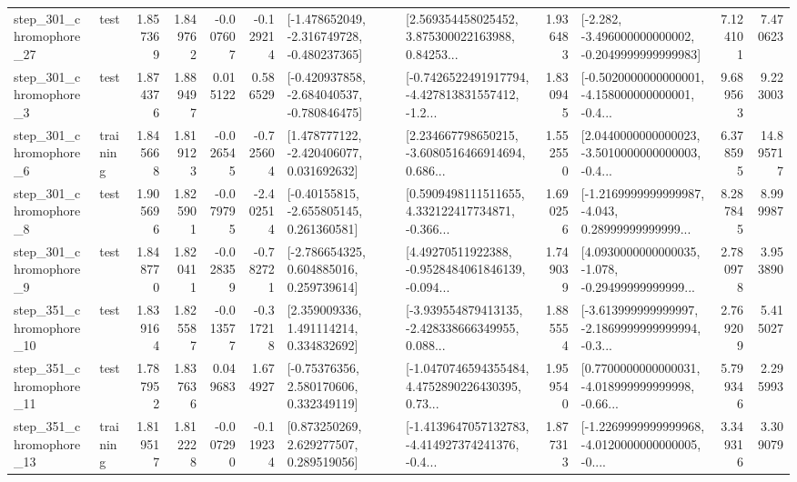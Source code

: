\begin{tabular}{llrrrrllrlrr}
  step\_301\_chromophore\_27 &      test &      1.857369 &    1.849762 &     -0.007607 & -0.129214 &  [-1.478652049, -2.316749728, -0.480237365] &  [2.569354458025452, 3.875300022163988, 0.84253... &       1.936483 &  [-2.282, -3.496000000000002, -0.2049999999999983] &            7.124101 &          7.470623 \\
   step\_301\_chromophore\_3 &      test &      1.874376 &    1.889497 &      0.015122 &  0.586529 &  [-0.420937858, -2.684040537, -0.780846475] &  [-0.7426522491917794, -4.427813831557412, -1.2... &       1.830945 &  [-0.5020000000000001, -4.158000000000001, -0.4... &            9.689563 &          9.223003 \\
   step\_301\_chromophore\_6 &  training &      1.845668 &    1.819123 &     -0.026545 & -0.725604 &    [1.478777122, -2.420406077, 0.031692632] &  [2.234667798650215, -3.6080516466914694, 0.686... &       1.552550 &  [2.0440000000000023, -3.5010000000000003, -0.4... &            6.378595 &         14.895717 \\
   step\_301\_chromophore\_8 &      test &      1.905696 &    1.825901 &     -0.079795 & -2.402514 &    [-0.40155815, -2.655805145, 0.261360581] &  [0.5909498111511655, 4.332122417734871, -0.366... &       1.690256 &  [-1.2169999999999987, -4.043, 0.28999999999999... &            8.287845 &          8.999987 \\
   step\_301\_chromophore\_9 &      test &      1.848770 &    1.820411 &     -0.028359 & -0.782721 &    [-2.786654325, 0.604885016, 0.259739614] &  [4.49270511922388, -0.9528484061846139, -0.094... &       1.749039 &  [4.0930000000000035, -1.078, -0.29499999999999... &            2.780978 &          3.953890 \\
  step\_351\_chromophore\_10 &      test &      1.839164 &    1.825587 &     -0.013577 & -0.317218 &     [2.359009336, 1.491114214, 0.334832692] &  [-3.939554879413135, -2.428338666349955, 0.088... &       1.885554 &  [-3.613999999999997, -2.1869999999999994, -0.3... &            2.769209 &          5.415027 \\
  step\_351\_chromophore\_11 &      test &      1.787952 &    1.837636 &      0.049683 &  1.674927 &     [-0.75376356, 2.580170606, 0.332349119] &  [-1.0470746594355484, 4.4752890226430395, 0.73... &       1.959540 &  [0.7700000000000031, -4.018999999999998, -0.66... &            5.799346 &          2.295993 \\
  step\_351\_chromophore\_13 &  training &      1.819517 &    1.812228 &     -0.007290 & -0.119234 &     [0.873250269, 2.629277507, 0.289519056] &  [-1.4139647057132783, -4.414927374241376, -0.4... &       1.877313 &  [-1.2269999999999968, -4.0120000000000005, -0.... &            3.349316 &          3.309079 \\

\end{tabular}
